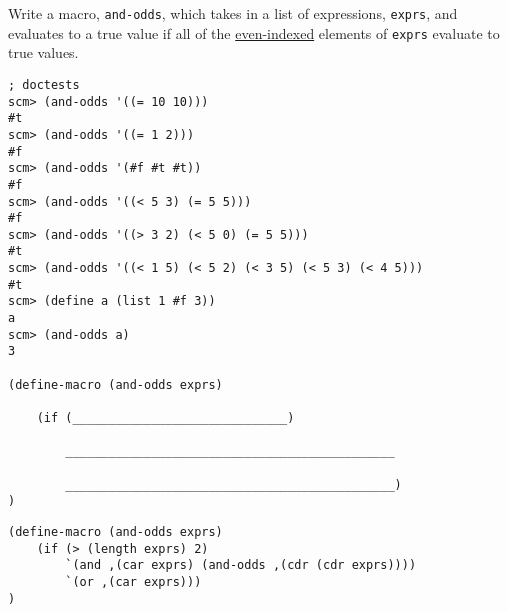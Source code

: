 \question
Write a macro, \lstinline{and-odds}, which takes in a list of expressions, \lstinline{exprs}, and evaluates to a true value if all of the \underline{even-indexed} elements of \lstinline{exprs} evaluate to true values.

\begin{lstlisting}
; doctests
scm> (and-odds '((= 10 10)))
#t
scm> (and-odds '((= 1 2)))
#f
scm> (and-odds '(#f #t #t))
#f
scm> (and-odds '((< 5 3) (= 5 5)))
#f
scm> (and-odds '((> 3 2) (< 5 0) (= 5 5)))
#t
scm> (and-odds '((< 1 5) (< 5 2) (< 3 5) (< 5 3) (< 4 5)))
#t
scm> (define a (list 1 #f 3))
a
scm> (and-odds a)
3

(define-macro (and-odds exprs)

    (if (______________________________)

        ______________________________________________

        ______________________________________________)
)
\end{lstlisting}

\begin{solution}
\begin{lstlisting}
(define-macro (and-odds exprs)
    (if (> (length exprs) 2)
        `(and ,(car exprs) (and-odds ,(cdr (cdr exprs))))
        `(or ,(car exprs)))
)
\end{lstlisting}
\end{solution}